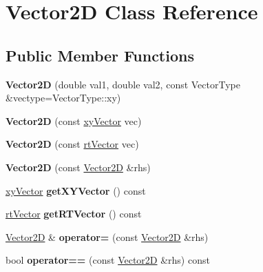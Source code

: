 \hypertarget{class_vector2_d}{}\section{Vector2D Class Reference}
\label{class_vector2_d}
\subsection*{Public Member Functions}
\begin{DoxyCompactItemize}
\item 
\mbox{\label{class_vector2_d_a0c1db105a3d49bde5056cc19b04f18c2}} 
{\bfseries Vector2D} (double val1, double val2, const Vector\+Type \&vectype=Vector\+Type\+::xy)
\item 
\mbox{\label{class_vector2_d_ab3aae16cfdb6eab642f832d82de2ac5c}} 
{\bfseries Vector2D} (const \hyperlink{structxy_vector}{xy\+Vector} vec)
\item 
\mbox{\label{class_vector2_d_a3253f7c676f03f9d460d6b473934a1ff}} 
{\bfseries Vector2D} (const \hyperlink{structrt_vector}{rt\+Vector} vec)
\item 
\mbox{\label{class_vector2_d_a658f4dd52408392ab5ad5fb36112a5c8}} 
{\bfseries Vector2D} (const \hyperlink{class_vector2_d}{Vector2D} \&rhs)
\item 
\mbox{\label{class_vector2_d_a4bc415751c246ae44727ef4f6b80d80c}} 
\hyperlink{structxy_vector}{xy\+Vector} {\bfseries get\+X\+Y\+Vector} () const
\item 
\mbox{\label{class_vector2_d_a2760dd54ac65996966d1b9077cbecb06}} 
\hyperlink{structrt_vector}{rt\+Vector} {\bfseries get\+R\+T\+Vector} () const
\item 
\mbox{\label{class_vector2_d_abfa56cdcf167527e7c5efd54c4c1bffe}} 
\hyperlink{class_vector2_d}{Vector2D} \& {\bfseries operator=} (const \hyperlink{class_vector2_d}{Vector2D} \&rhs)
\item 
\mbox{\label{class_vector2_d_a41f425fcd08fb82c7e72e132fb51136f}} 
bool {\bfseries operator==} (const \hyperlink{class_vector2_d}{Vector2D} \&rhs) const

\end{DoxyCompactItemize}
